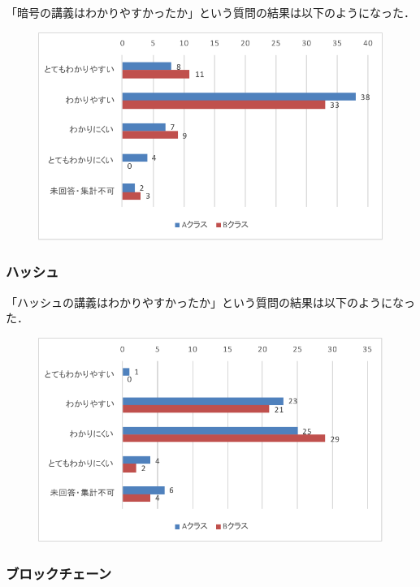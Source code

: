 \documentclass[a4j,12pt]{jsarticle}
\begin{document}
「暗号の講義はわかりやすかったか」という質問の結果は以下のようになった．
\begin{figure}[H]
\centering
\includegraphics[width=12cm]{anka1.pdf}
\label{fig:time}
\end{figure}


\subsubsection{ハッシュ}


「ハッシュの講義はわかりやすかったか」という質問の結果は以下のようになった．
\begin{figure}[H]
\centering
\includegraphics[width=12cm]{ankh1.pdf}
\label{fig:time}
\end{figure}


\newpage
\subsubsection{ブロックチェーン}
\end{document}
